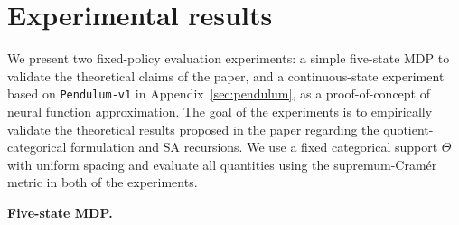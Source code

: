 \documentclass{article}
\begin{document}
\section{Experimental results}
We present two fixed-policy evaluation experiments: a simple five-state MDP to validate the theoretical claims of the paper, and a continuous-state experiment based on \texttt{Pendulum-v1} \citep{gym} in Appendix~\ref{sec:pendulum}, as a proof-of-concept of neural function approximation. 
The goal of the experiments is to empirically validate the theoretical results proposed in the paper regarding the quotient-categorical formulation and SA recursions. We use a fixed categorical support $\Theta$ with uniform spacing and evaluate all quantities using the supremum-Cramér metric in both of the experiments.

\noindent\textbf{Five-state MDP.}
\end{document}

